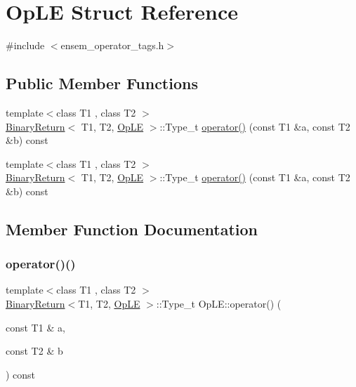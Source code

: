 \hypertarget{structOpLE}{}\section{Op\+LE Struct Reference}
\label{structOpLE}


{\ttfamily \#include $<$ensem\+\_\+operator\+\_\+tags.\+h$>$}

\subsection*{Public Member Functions}
\begin{DoxyCompactItemize}
\item 
{\footnotesize template$<$class T1 , class T2 $>$ }\\\mbox{\hyperlink{structBinaryReturn}{Binary\+Return}}$<$ T1, T2, \mbox{\hyperlink{structOpLE}{Op\+LE}} $>$\+::Type\+\_\+t \mbox{\hyperlink{structOpLE_a59addad5005738f86a6d4a5216c9348f}{operator()}} (const T1 \&a, const T2 \&b) const
\item 
{\footnotesize template$<$class T1 , class T2 $>$ }\\\mbox{\hyperlink{structBinaryReturn}{Binary\+Return}}$<$ T1, T2, \mbox{\hyperlink{structOpLE}{Op\+LE}} $>$\+::Type\+\_\+t \mbox{\hyperlink{structOpLE_a59addad5005738f86a6d4a5216c9348f}{operator()}} (const T1 \&a, const T2 \&b) const
\end{DoxyCompactItemize}


\subsection{Member Function Documentation}
\mbox{\label{structOpLE_a59addad5005738f86a6d4a5216c9348f}} 
\subsubsection{\texorpdfstring{operator()()}{operator()()}\hspace{0.1cm}{\footnotesize\ttfamily [1/2]}}
{\footnotesize\ttfamily template$<$class T1 , class T2 $>$ \\
\mbox{\hyperlink{structBinaryReturn}{Binary\+Return}}$<$T1, T2, \mbox{\hyperlink{structOpLE}{Op\+LE}} $>$\+::Type\+\_\+t Op\+L\+E\+::operator() (\begin{DoxyParamCaption}\item[{const T1 \&}]{a,  }\item[{const T2 \&}]{b }\end{DoxyParamCaption}) const\hspace{0.3cm}{\ttfamily [inline]}}

